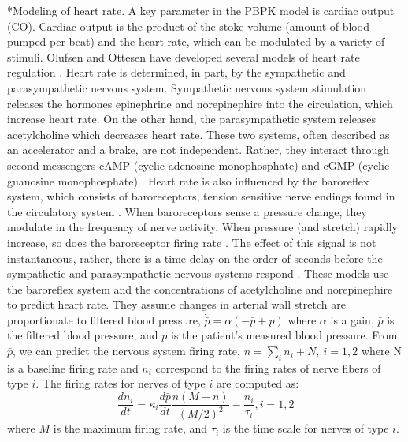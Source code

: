 \documentclass[11pt]{article}
\makeatletter
\renewcommand\subsection{\@startsection
	{subsection}{2}{0mm}
	{-0.05in}
	{-0.5\baselineskip}
	{\normalfont\normalsize\bfseries}}
\makeatother
\begin{document}
\subsection*{Modeling of heart rate.}
A key parameter in the PBPK model is cardiac output (CO). Cardiac output is the product of the stoke volume (amount of blood pumped per beat) and the heart rate, which can be modulated by a variety of stimuli. Olufsen and Ottesen have developed several models of heart rate regulation \citep{olufsen2006modeling, ottesen1997modelling,olufsen2008modeling,olufsen2013practical}.
Heart rate is determined, in part, by the sympathetic and parasympathetic nervous system.
Sympathetic nervous system stimulation releases the hormones epinephrine and norepinephire into the circulation, which increase heart rate.
On the other hand, the parasympathetic system releases acetylcholine which decreases heart rate.
These two systems, often described as an accelerator and a brake, are not independent.
Rather, they interact through second messengers cAMP (cyclic adenosine monophosphate) and cGMP (cyclic guanosine monophosphate) \citep{olshansky2008parasympathetic}.
Heart rate is also influenced by the baroreflex system, which consists of baroreceptors, tension sensitive nerve endings found in the circulatory system \citep{ottesen1997modelling}.
When baroreceptors sense a pressure change, they modulate in the frequency of nerve activity.
When pressure (and stretch) rapidly increase, so does the baroreceptor firing rate \citep{negative1999reflexes}.
The effect of this signal is not instantaneous, rather, there is a time delay on the order of seconds before the sympathetic and parasympathetic nervous systems respond \citep{ottesen1997modelling}. These models use the baroreflex system and the concentrations of acetylcholine and norepinephire to predict heart rate.
They assume changes in arterial wall stretch are proportionate to filtered blood pressure, $\dot{\bar{p}} = \alpha(-\bar p + p)$
where $\alpha$ is a gain, $\bar p$ is the filtered blood pressure, and $p$ is the patient's measured blood pressure.
From $\bar p$, we can predict the nervous system firing rate, $n = \sum_i n_i + N,~i = 1,2$
where N is a baseline firing rate and $n_i$ correspond to the firing rates of nerve fibers of type $i$.
The firing rates for nerves of type $i$ are computed as:
\begin{equation}
\frac{dn_i}{dt} = \kappa_i \frac{d \bar p}{dt} \frac{n(M-n)}{(M/2)^2}-\frac{n_i}{\tau_i}, i = 1,2
\end{equation}
where $M$ is the maximum firing rate, and $\tau_i$ is the time scale for nerves of type $i$.
\end{document}
